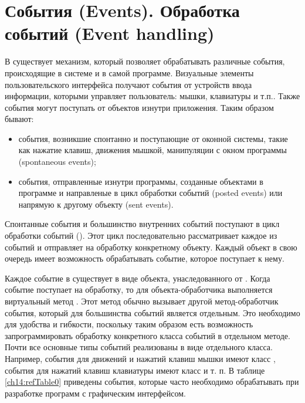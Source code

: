 \section[События (Events). Обработка событий (Event handling)]{События (Events). Обработка событий (Event handling)}
В  существует механизм, который позволяет обрабатывать различные события, происходящие в системе и в самой программе.
Визуальные элементы пользовательского интерфейса получают события от устройств ввода информации, которыми управляет
пользователь: мышки, клавиатуры и т.п.. Также события могут поступать от объектов изнутри приложения.
Таким образом бывают:

\begin{itemize}
\item события, возникшие спонтанно и поступающие от оконной системы, такие как нажатие клавиш, движения мышкой,
манипуляции с окном программы (spontaneous events);
\item события, отправленные изнутри программы, созданные объектами в программе  и направленые в цикл обработки событий
(posted events) или напрямую к другому объекту (sent events).
\end{itemize}
Спонтанные события и большинство внутренних событий поступают в цикл обработки событий
(). Этот цикл последовательно рассматривает каждое из событий и отправляет на обработку конкретному
объекту. Каждый объект в свою очередь имеет возможность обрабатывать событие, которое поступает к нему.

Каждое событие в  существует в виде объекта, унаследованного от . Когда событие
поступает на обработку, то для объекта-обработчика выполняется виртуальный метод . Этот метод
обычно вызывает другой метод-обработчик события, который для большинства событий является отдельным. Это необходимо для
удобства и гибкости, поскольку таким образом есть возможность запрограммировать обработку конкретного класса событий в
отдельном методе. Почти все основные типы событий реализованы в виде отдельного класса. Например, события для движений
и нажатий клавиш мышки имеют класс , события для нажатий клавиш клавиатуры имеют класс
 и т. п. В таблице \ref{ch14:refTable0} приведены события, которые часто необходимо обрабатывать при
разработке программ с графическим интерфейсом.

